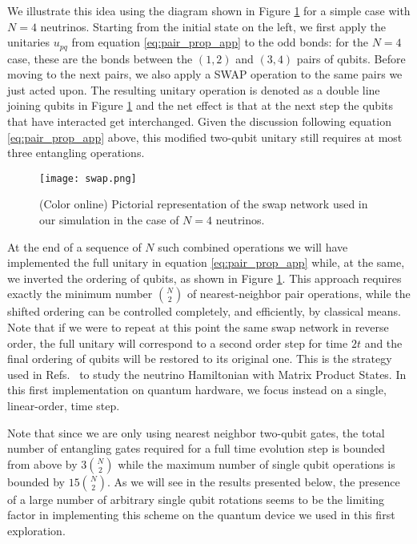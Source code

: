 \documentclass[Dual]{msu-thesis}
\begin{document}
We illustrate this idea using the diagram shown in Figure \ref{fig:swap_network} for a simple case with $N=4$ neutrinos. Starting from the initial state on the left, we first apply the unitaries $u_{pq}$ from equation \eqref{eq:pair_prop_app} to the odd bonds: for the $N=4$ case, these are the bonds between the $(1,2)$ and $(3,4)$ pairs of qubits. Before moving to the next pairs, we also apply a SWAP operation to the same pairs we just acted upon. The resulting unitary operation is denoted as a double line joining qubits in Figure \ref{fig:swap_network} and the net effect is that at the next step the qubits that have interacted get interchanged. Given the discussion following equation \eqref{eq:pair_prop_app} above, this modified two-qubit unitary still requires at most three entangling operations.

\begin{figure}[h]
 \centering
 \texttt{[image: swap.png]}
 \caption{(Color online) Pictorial representation of the swap network used in our simulation in the case of $N=4$ neutrinos.}
\label{fig:swap_network}
\end{figure}

At the end of a sequence of $N$ such combined operations we will have implemented the full unitary in equation \eqref{eq:pair_prop_app} while, at the same, we inverted the ordering of qubits, as shown in Figure \ref{fig:swap_network}. This approach requires exactly the minimum number $\binom{N}{2}$ of nearest-neighbor pair operations, while the shifted ordering can be controlled completely, and efficiently, by classical means. Note that if we were to repeat at this point the same swap network in reverse order, the full unitary will correspond to a second order step for time $2t$ and the final ordering of qubits will be restored to its original one. This is the strategy used in Refs.~\cite{Roggero2021a,Roggero2021b} to study the neutrino Hamiltonian with Matrix Product States. In this first implementation on quantum hardware, we focus instead on a single, linear-order, time step.

Note that since we are only using nearest neighbor two-qubit gates, the total number of entangling gates required for a full time evolution step is bounded from above by $3\binom{N}{2}$ while the maximum number of single qubit operations is bounded by $15\binom{N}{2}$. As we will see in the results presented below, the presence of a large number of arbitrary single qubit rotations seems to be the limiting factor in implementing this scheme on the quantum device we used in this first exploration.
\end{document}
